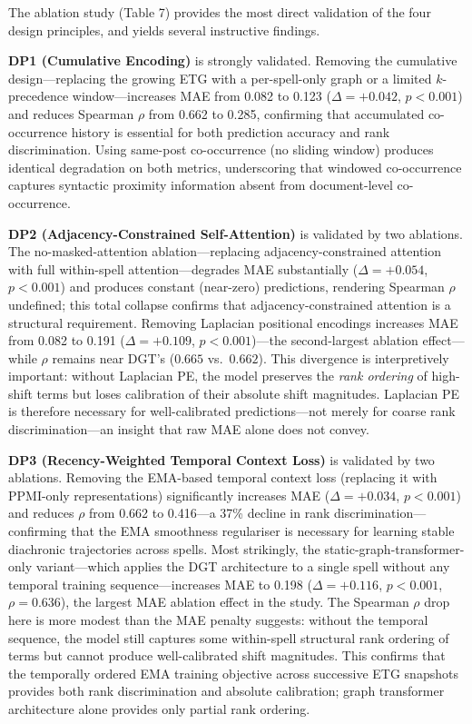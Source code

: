 \documentclass[12pt]{article}
\begin{document}
The ablation study (Table 7) provides the most direct validation of the four design principles, and yields several instructive findings.

\textbf{DP1 (Cumulative Encoding)} is strongly validated. Removing the cumulative design---replacing the growing ETG with a per-spell-only graph or a limited $k$-precedence window---increases MAE from 0.082 to 0.123 ($\Delta = +0.042$, $p < 0.001$) and reduces Spearman $\rho$ from 0.662 to 0.285, confirming that accumulated co-occurrence history is essential for both prediction accuracy and rank discrimination. Using same-post co-occurrence (no sliding window) produces identical degradation on both metrics, underscoring that windowed co-occurrence captures syntactic proximity information absent from document-level co-occurrence.

\textbf{DP2 (Adjacency-Constrained Self-Attention)} is validated by two ablations. The no-masked-attention ablation---replacing adjacency-constrained attention with full within-spell attention---degrades MAE substantially ($\Delta = +0.054$, $p < 0.001$) and produces constant (near-zero) predictions, rendering Spearman $\rho$ undefined; this total collapse confirms that adjacency-constrained attention is a structural requirement. Removing Laplacian positional encodings increases MAE from 0.082 to 0.191 ($\Delta = +0.109$, $p < 0.001$)---the second-largest ablation effect---while $\rho$ remains near DGT's ($0.665$ vs.\ $0.662$). This divergence is interpretively important: without Laplacian PE, the model preserves the \textit{rank ordering} of high-shift terms but loses calibration of their absolute shift magnitudes. Laplacian PE is therefore necessary for well-calibrated predictions---not merely for coarse rank discrimination---an insight that raw MAE alone does not convey.

\textbf{DP3 (Recency-Weighted Temporal Context Loss)} is validated by two ablations. Removing the EMA-based temporal context loss (replacing it with PPMI-only representations) significantly increases MAE ($\Delta = +0.034$, $p < 0.001$) and reduces $\rho$ from 0.662 to 0.416---a 37\% decline in rank discrimination---confirming that the EMA smoothness regulariser is necessary for learning stable diachronic trajectories across spells. Most strikingly, the static-graph-transformer-only variant---which applies the DGT architecture to a single spell without any temporal training sequence---increases MAE to 0.198 ($\Delta = +0.116$, $p < 0.001$, $\rho = 0.636$), the largest MAE ablation effect in the study. The Spearman $\rho$ drop here is more modest than the MAE penalty suggests: without the temporal sequence, the model still captures some within-spell structural rank ordering of terms but cannot produce well-calibrated shift magnitudes. This confirms that the temporally ordered EMA training objective across successive ETG snapshots provides both rank discrimination and absolute calibration; graph transformer architecture alone provides only partial rank ordering.
\end{document}
